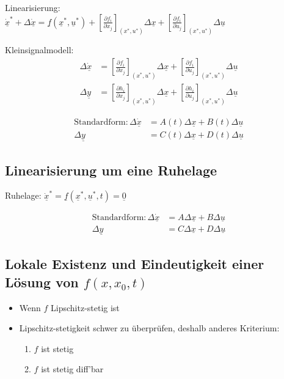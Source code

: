 \documentclass[6pt,a4paper,fleqn]{scrartcl}
\begin{document}
\begin{multicols*}{4}
Linearisierung: \\
$\underline{\dot{x}}^* + \Delta\underline{\dot{x}} = \underline{f}\left( \underline{x}^*, \underline{u}^* \right) + 
\left[ \frac{\partial f_i}{\partial x_j} \right]_{(x^*, u^*)} \Delta\underline{x} +
\left[ \frac{\partial f_i}{\partial u_j} \right]_{(x^*, u^*)} \Delta\underline{u} 
$

Kleinsignalmodell:
\begin{align*}
  \Delta \underline{\dot{x}}    &=  \left[ \frac{\partial f_i}{\partial x_j} \right]_{(x^*, u^*)} \Delta\underline{x} +
                                    \left[ \frac{\partial f_i}{\partial u_j} \right]_{(x^*, u^*)} \Delta\underline{u} \\
  \Delta \underline{{y}}        &=  \left[ \frac{\partial h_i}{\partial x_j} \right]_{(x^*, u^*)} \Delta\underline{x} +
                                    \left[ \frac{\partial h_i}{\partial u_j} \right]_{(x^*, u^*)} \Delta\underline{u}
\end{align*}

\begin{align*}
  \text{Standardform:} \,
  \Delta \underline{\dot{x}}    &=  A(t) \Delta\underline{x} + B(t) \Delta\underline{u} \\
  \Delta \underline{y}          &=  C(t) \Delta\underline{x} + D(t) \Delta\underline{u}
\end{align*}


\subsection{Linearisierung um eine Ruhelage}

Ruhelage: $\underline{\dot{x}}^* = \underline{f}\left( \underline{x}^*, \underline{u}^*, t \right) = \underline{0}$

\begin{align*}
  \text{Standardform:} \,
  \Delta \underline{\dot{x}}    &=  A \Delta\underline{x} + B \Delta\underline{u} \\
  \Delta \underline{y}          &=  C \Delta\underline{x} + D \Delta\underline{u}
\end{align*}


\subsection{Lokale Existenz und Eindeutigkeit einer Lösung von $f(x,x_0,t)$}

\begin{itemize}
  \item Wenn $f$ Lipschitz-stetig ist
  \item Lipschitz-stetigkeit schwer zu überprüfen, deshalb anderes Kriterium:
    \begin{enumerate}
      \item $f$ ist stetig
      \item $f$ ist stetig diff'bar
    \end{enumerate}
\end{itemize}


\end{multicols*}
\end{document}

